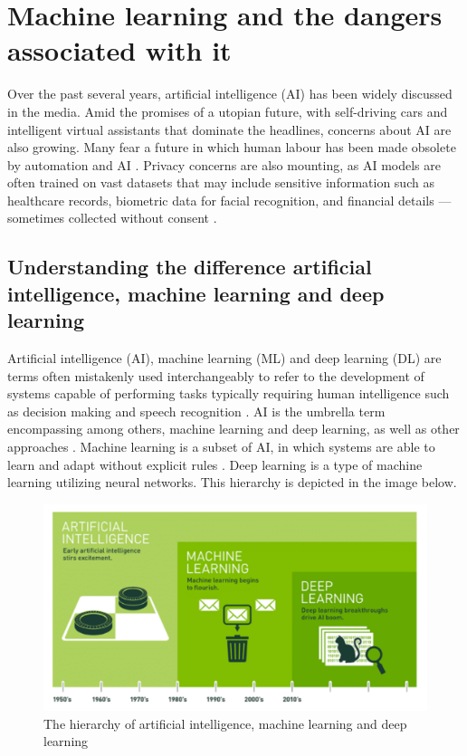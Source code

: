 \documentclass[licencjacka,en]{pracamgr}
\begin{document}
\chapter{Machine learning and the dangers associated with it}

Over the past several years, artificial intelligence (AI) has been widely discussed in the media. Amid the promises of a utopian future, with self-driving cars and intelligent virtual assistants that dominate the headlines, concerns about AI are also growing. Many fear a future in which human labour has been made obsolete by automation and AI \cite{francuz_1}. Privacy concerns are also mounting, as AI models are often trained on vast datasets that may include sensitive information such as healthcare records, biometric data for facial recognition, and financial details — sometimes collected without consent \cite{ibm_privacy}.

\section{Understanding the difference artificial intelligence, machine learning and deep learning}
Artificial intelligence (AI), machine learning (ML) and deep learning (DL) are terms often mistakenly used interchangeably to refer to the development of systems capable of performing tasks typically requiring human intelligence such as decision making and speech recognition \cite{ibm_ai}. AI is the umbrella term encompassing among others, machine learning and deep learning, as well as other approaches \cite{francuz_2}. Machine learning is a subset of AI, in which systems are able to learn and adapt without explicit rules \cite{ibm_ai}. Deep learning is a type of machine learning utilizing neural networks. This hierarchy is depicted in the image below.

\begin{figure}
    \centering
    \includegraphics[width=0.5\linewidth]{bachelor_images/nvidia_ai_hierarchy.png}
    \caption{The hierarchy of artificial intelligence, machine learning and deep learning \cite{nvidiaimage}}
    \label{fig:hierarchy-ai-ml-dl}
\end{figure}
\end{document}

